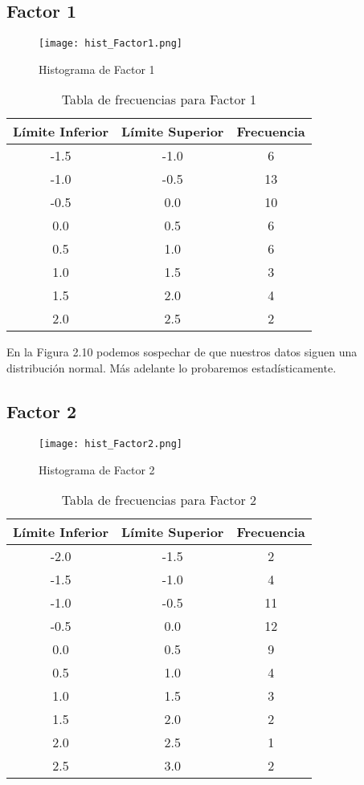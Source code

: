 \documentclass[12pt]{report}
\begin{document}
\subsection{Factor 1}
\begin{figure}[H]
    \centering
    \texttt{[image: hist\_Factor1.png]}
    \caption{Histograma de Factor 1}
\end{figure}

\begin{table}[H]
\centering
\begin{tabular}{|c|c|c|}
\hline
\textbf{Límite Inferior} & \textbf{Límite Superior} & \textbf{Frecuencia} \\
\hline
-1.5 & -1.0 & 6 \\
-1.0 & -0.5 & 13 \\
-0.5 &  0.0 & 10 \\
 0.0 &  0.5 & 6 \\
 0.5 &  1.0 & 6 \\
 1.0 &  1.5 & 3 \\
 1.5 &  2.0 & 4 \\
 2.0 &  2.5 & 2 \\
\hline
\end{tabular}
\caption{Tabla de frecuencias para Factor 1}
\end{table}

\noindent En la Figura 2.10 podemos sospechar de que nuestros datos siguen una distribución normal. Más adelante lo probaremos estadísticamente.

\subsection{Factor 2}
\begin{figure}[H]
    \centering
    \texttt{[image: hist\_Factor2.png]}
    \caption{Histograma de Factor 2}
\end{figure}

\begin{table}[H]
\centering
\begin{tabular}{|c|c|c|}
\hline
\textbf{Límite Inferior} & \textbf{Límite Superior} & \textbf{Frecuencia} \\
\hline
-2.0 & -1.5 & 2 \\
-1.5 & -1.0 & 4 \\
-1.0 & -0.5 & 11 \\
-0.5 &  0.0 & 12 \\
 0.0 &  0.5 & 9 \\
 0.5 &  1.0 & 4 \\
 1.0 &  1.5 & 3 \\
 1.5 &  2.0 & 2 \\
 2.0 &  2.5 & 1 \\
 2.5 &  3.0 & 2 \\
\hline
\end{tabular}
\caption{Tabla de frecuencias para Factor 2}
\end{table}
\end{document}
